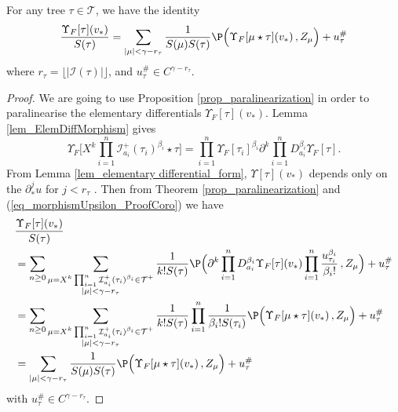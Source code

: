 \documentclass[11pt]{preprint}
\newcommand{\mcI}{\mathcal{I}}
\newcommand{\mcT}{\mathcal{T}}
\def\eqref#1{(\ref{#1})}
\begin{document}
	
	\begin{corollary}\label{cor_paralinearistaion2}
		For any tree $\tau\in\mcT$, we have the identity
		$$
			\frac{\Upsilon_F[\tau](v_*)}{S(\tau)} =  \sum_{\substack{ |\mu|<\gamma- r_\tau}} \frac{1}{S(\mu) S(\tau)}\P\Big(  \Upsilon_F[\mu \star \tau](v_*)  \, ,Z_\mu\Big)  + u_\tau^\#
		$$
		where  $r_\tau=\lfloor |\mcI(\tau)| \rfloor$, and $u_\tau^\# \in C^{\gamma-r_\tau}$.
	\end{corollary}
	
	\begin{proof}
		We are going to use Proposition \ref{prop_paralinearization} in order to paralinearise the elementary differentials $ \Upsilon_F[\tau](v_*)$.
		Lemma \ref{lem_ElemDiffMorphism} gives
		\begin{equation}\label{eq_morphismUpsilon_ProofCoro}
			\Upsilon_F\Big[X^k\prod_{i=1}^{n}\mcI^+_{a_i} (\tau_i)^{\beta_i} \star \tau  \Big] = \prod_{i=1}^{n} \Upsilon_F[\tau_i]^{\beta_i} \partial^k \prod_{i=1}^n D_{a_i}^{\beta_i} \Upsilon_F[\tau].
		\end{equation}
		From Lemma \ref{lem_elementary differential_form}, $\Upsilon[\tau](v_*)$ depends only on the $\partial^j_*u$ for $j<r_\tau$ . Then from Theorem \ref{prop_paralinearization} and \eqref{eq_morphismUpsilon_ProofCoro} we have
		\begin{equation*}
			\begin{aligned}
			& 	\frac{\Upsilon_F[\tau](v_*)}{S(\tau)} 
			\\	& = \sum_{n\geq 0}\sum_{\substack{\mu =  X^k \prod_{i=1}^{n}\mcI^+_{a_i}(\tau_i)^{\beta_i}\in\mcT^+ \\ |\mu|<\gamma-r_\tau}} \frac{1}{  k! S(\tau)}\P\Big( \partial^k \prod_{i=1}^n D_{a_i}^{\beta_i} \Upsilon_F[\tau](v_*) \prod_{i=1}^{n} \frac{u_{\tau_i}^{\beta_i}}{\beta_i!} \, ,Z_\mu\Big)  + u_\tau^\#
				\\ & = \sum_{n\geq 0}\sum_{\substack{\mu=  X^k \prod_{i=1}^{n}\mcI^+_{a_i}(\tau_i)^{\beta_i}\in\mcT^+ \\ |\mu|<\gamma-r_\tau}} \frac{1}{ k!S(\tau) } \prod_{i=1}^n \frac{1}{\beta_i ! S(\tau_i)}\P\Big(  \Upsilon_F[\mu \star \tau](v_*)  \, ,Z_\mu\Big)  + u_\tau^\#
				\\ & = \sum_{\substack{ |\mu|<\gamma-r_\tau}} \frac{1}{S(\mu) S(\tau)}\P\Big(  \Upsilon_F[\mu \star \tau](v_*)  \, ,Z_\mu\Big)  + u_\tau^\#
			\end{aligned}
		\end{equation*}
		with $u_\tau^\#\in C^{\gamma-r_\tau}$.
	\end{proof}
	
\end{document}
